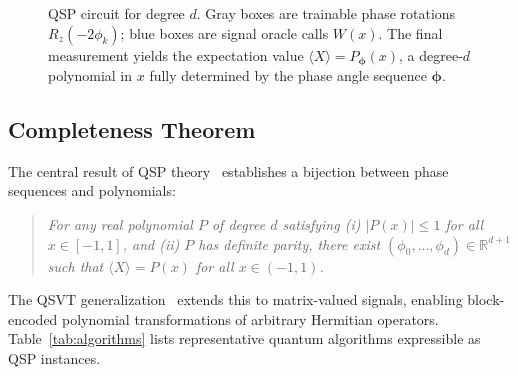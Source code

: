 \documentclass[11pt,a4paper]{article}
\begin{document}
\begin{figure}[ht]
\caption{QSP circuit for degree $d$. Gray boxes are trainable phase rotations $R_z(-2\phi_k)$; blue boxes are signal oracle calls $W(x)$. The final measurement yields the expectation value $\langle X\rangle = P_{\boldsymbol{\phi}}(x)$, a degree-$d$ polynomial in $x$ fully determined by the phase angle sequence $\boldsymbol{\phi}$.}
\label{fig:qsp_circuit}
\end{figure}


\subsection{Completeness Theorem}

The central result of QSP theory~\cite{low2017optimal, martyn2021grand} establishes a bijection between phase sequences and polynomials:

\begin{quote}\itshape
For any real polynomial $P$ of degree $d$ satisfying (i) $|P(x)|\le 1$ for all $x\in[-1,1]$, and (ii) $P$ has definite parity, there exist $(\phi_0,\ldots,\phi_d)\in\mathbb{R}^{d+1}$ such that $\langle X\rangle = P(x)$ for all $x\in(-1,1)$.
\end{quote}

The QSVT generalization~\cite{gilyen2019quantum} extends this to matrix-valued signals, enabling block-encoded polynomial transformations of arbitrary Hermitian operators. Table~\ref{tab:algorithms} lists representative quantum algorithms expressible as QSP instances.
\end{document}
